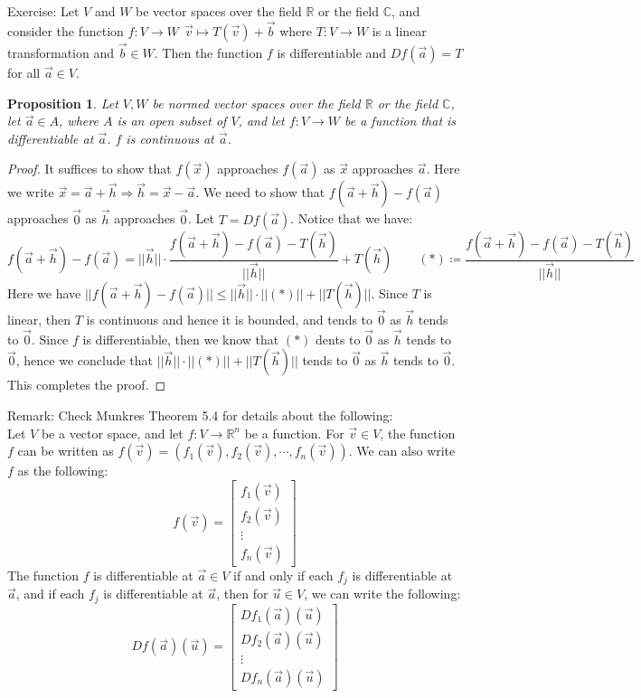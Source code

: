 \documentclass[15pt]{book}
\theoremstyle{break}
\theoremstyle{break}
\newtheorem{prop}[lem]{Proposition}
\newcommand{\R}{\mathbb{R}}
\newcommand{\Complex}{\mathbb{C}}
\newcommand{\remark}{\color{blue}Remark: \color{black}}
\newcommand{\exercise}{\color{green}Exercise: \color{black}}
\begin{document}
\exercise Let $V$ and $W$ be vector spaces over the field $\R$ or the field $\Complex$, and consider the function $f:V \to W \ \ \vec{v}\mapsto T(\vec{v})+\vec{b}$ where $T:V\to W$ is a linear transformation and $\vec{b}\in W$. Then the function $f$ is differentiable and $Df(\vec{a}) = T$ for all $\vec{a}\in V$.

\begin{prop}
Let $V,W$ be normed vector spaces over the field $\R$ or the field $\Complex$, let $\vec{a}\in A$, where $A$ is an open subset of $V$, and let $f:V \to W$ be a function that is differentiable at $\vec{a}$. $f$ is continuous at $\vec{a}$.
\end{prop}
\begin{proof}
It suffices to show that $f(\vec{x})$ approaches $f(\vec{a})$ as $\vec{x}$ approaches $\vec{a}$. Here we write $\vec{x} = \vec{a}+\vec{h} \Rightarrow \vec{h} = \vec{x}-\vec{a}$. We need to show that $f(\vec{a}+\vec{h}) - f(\vec{a})$ approaches $\vec{0}$ as $\vec{h}$ approaches $\vec{0}$. Let $T = Df(\vec{a})$.  Notice that we have: 
$$f(\vec{a}+\vec{h}) - f(\vec{a}) = ||\vec{h}||\cdot \frac{f(\vec{a}+\vec{h}) - f(\vec{a})-T(\vec{h})}{||\vec{h}||}+T(\vec{h})\qquad  (*)\coloneqq \frac{f(\vec{a}+\vec{h}) - f(\vec{a})-T(\vec{h})}{||\vec{h}||}$$ Here we have $||f(\vec{a}+\vec{h})-f(\vec{a})|| \leq ||\vec{h}||\cdot ||(*)||+||T(\vec{h})||$. Since $T$ is linear, then $T$ is continuous and hence it is bounded, and tends to $\vec{0}$ as $\vec{h}$ tends to $\vec{0}$. Since $f$ is differentiable, then we know that $(*)$ dents to $\vec{0}$ as $\vec{h}$ tends to $\vec{0}$, hence we conclude that $||\vec{h}||\cdot ||(*)||+||T(\vec{h})||$ tends to $\vec{0}$ as $\vec{h}$ tends to $\vec{0}$. This completes the proof.
\end{proof}
\newpage
\remark Check Munkres Theorem 5.4 for details about the following:\\
Let $V$ be a vector space, and let $f:V \to \R^n$ be a function. For $\vec{v}\in V$, the function $f$ can be written as $f(\vec{v}) = (f_1(\vec{v}),f_2(\vec{v}),\cdots, f_n(\vec{v}))$. We can also write $f$ as the following:
$$f(\vec{v})=\begin{bmatrix}
f_1(\vec{v})\\f_2(\vec{v})\\\vdots\\f_n(\vec{v})
\end{bmatrix}$$
The function $f$ is differentiable at $\vec{a}\in V$ if and only if each $f_j$ is differentiable at $\vec{a}$, and if each $f_j$ is differentiable at $\vec{a}$, then for $\vec{u} \in V$, we can write the following:
$$Df(\vec{a})(\vec{u}) = 
\begin{bmatrix}
Df_1(\vec{a})(\vec{u})\\Df_2(\vec{a})(\vec{u})\\\vdots \\Df_n(\vec{a})(\vec{u})
\end{bmatrix}
$$
\end{document}
